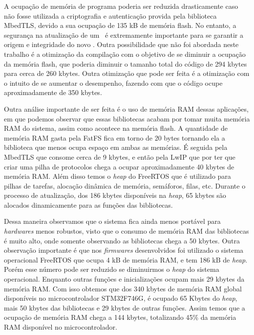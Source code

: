 A ocupação de memória de programa poderia ser reduzida drasticamente caso não fosse utilizada a criptografia e autenticação provida pela biblioteca MbedTLS, devido a sua ocupação de 135 kB de memória flash. No entanto, a segurança na atualização de um \firmware\ é extremamente importante para se garantir a origem e integridade do novo \firmware. Outra possibilidade que não foi abordada neste trabalho é a otimização da compilação com o objetivo de se diminuir a ocupação da memória flash, que poderia diminuir o tamanho total do código de 294 kbytes para cerca de 260 kbytes. Outra otimização que pode ser feita é a otimização com o intuito de se aumentar o desempenho, fazendo com que o código ocupe aproximadamente de 350 kbytes.

Outra análise importante de ser feita é o uso de memória RAM dessas aplicações, em que podemos observar que essas bibliotecas acabam por tomar muita memória RAM do sistema, assim como acontece na memória flash. A quantidade de memória RAM gasta pela FatFS fica em torno de 20 bytes tornando ela a biblioteca que menos ocupa espaço em ambas as memórias. É seguida pela MbedTLS que consome cerca de 9 kbytes, e então pela LwIP que por ter que criar uma pilha de protocolos chega a ocupar aproximadamente 40 kbytes de memória RAM. Além disso temos o \textit{heap} do FreeRTOS que é utilizado para pilhas de tarefas, alocação dinâmica de memória, semáforos, filas, etc. Durante o processo de atualização, dos 186 kbytes disponíveis na \textit{heap}, 65 kbytes são alocados dinamicamente para as funções das bibliotecas.

Dessa maneira observamos que o sistema fica ainda menos portável para \textit{hardwares} menos robustos, visto que o consumo de memória RAM das bibliotecas é muito alto, onde somente observando as bibliotecas chega a 50 kbytes. Outra observação importante é que nos \textit{firmwares} desenvolvidos foi utilizado o sistema operacional FreeRTOS que ocupa 4 kB de memória RAM, e tem 186 kB de \textit{heap}. Porém esse número pode ser reduzido se diminuirmos o \textit{heap} do sistema operacional. Enquanto outras funções e inicializações ocupam mais 29 kbytes da memória RAM. Com isso obtemos que dos 340 kbytes de memória RAM global disponíveis no microcontrolador STM32F746G, é ocupado 65 Kbytes do \textit{heap}, mais 50 kbytes das bibliotecas e 29 kbytes de outras funções. Assim temos que a ocupação de memória RAM chega a 144 kbytes, totalizando 45\% da memória RAM disponível no microcontrolador. 

